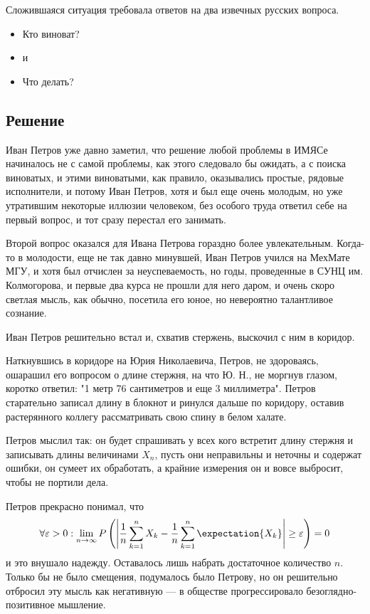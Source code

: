 \documentclass[a4paper,12pt]{article}
\begin{document}
    Сложившаяся ситуация требовала ответов на два извечных русских вопроса.
    \begin{itemize}
        \item Кто виноват?
        \item [] и
        \item Что делать?
    \end{itemize}

    \subsection*{Решение}
    Иван Петров уже давно заметил, что решение любой проблемы в ИМЯСе начиналось не с самой проблемы, как этого следовало бы ожидать, а с поиска виноватых, и этими
    виноватыми, как правило, оказывались простые, рядовые исполнители, и потому Иван Петров, хотя и был еще очень молодым, но уже утратившим некоторые иллюзии человеком,
    без особого труда ответил себе на первый вопрос, и тот сразу перестал его занимать.

    Второй вопрос оказался для Ивана Петрова гораздно более увлекательным. Когда-то в молодости, еще не так давно минувшей, Иван Петров учился на МехМате МГУ, и хотя был
    отчислен за неуспеваемость, но годы, проведенные в СУНЦ им. Колмогорова, и первые два курса не прошли для него даром, и очень скоро светлая мысль, как обычно, посетила
    его юное, но невероятно талантливое сознание.

    Иван Петров решительно встал и, схватив стержень, выскочил с ним в коридор.

    Наткнувшись в коридоре на Юрия Николаевича, Петров, не здороваясь, ошарашил его вопросом о
    длине стержня, на что Ю. Н., не моргнув глазом, коротко ответил: "1 метр 76 сантиметров и еще 3 миллиметра". Петров старательно записал длину в блокнот и
    ринулся дальше по коридору, оставив растерянного коллегу рассматривать свою спину в белом халате.

    Петров мыслил так: он будет спрашивать у всех кого встретит длину стержня и записывать длины величинами $X_n$, пусть они неправильны и неточны и содержат ошибки, он сумеет
    их обработать, а крайние измерения он и вовсе выбросит, чтобы не портили дела.

    Петров прекрасно понимал, что
    \begin{equation}
        \forall \varepsilon > 0: \lim_{n \rightarrow \infty} \probability{ \modulus{ \frac{1}{n} \sum_{k=1}^n X_k - \frac{1}{n} \sum_{k=1}^n \expectation{X_k} } \ge \varepsilon } = 0
    \end{equation}
    и это внушало надежду. Оставалось лишь набрать достаточное количество $n$. Только бы не было смещения, подумалось было Петрову, но он решительно отбросил эту мысль
    как негативную --- в обществе прогрессировало безоглядно-позитивное мышление.
\end{document}
